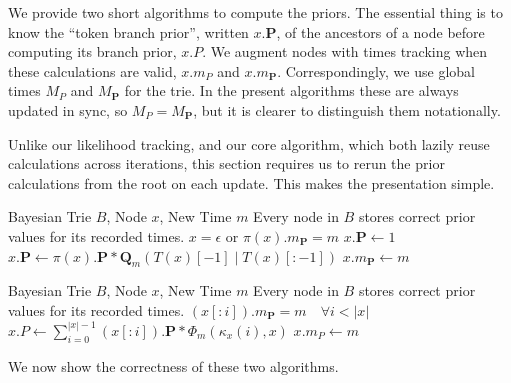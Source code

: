 We provide two short algorithms to compute the priors.
The essential thing is to know the ``token branch prior'', written $x.\mathbf{P}$,
of the ancestors
of a node before computing its branch prior, $x.P$.
We augment nodes with times tracking when these calculations 
are valid, $x.m_P$ and $x.m_\mathbf{P}$.
Correspondingly, we use global times $M_P$ and $M_\mathbf{P}$ for the trie.
In the present algorithms these are always updated in sync, so $M_P = M_\mathbf{P}$,
but it is clearer to distinguish them notationally.

Unlike our likelihood tracking, and our core algorithm, which both
lazily reuse calculations across iterations, this section requires
us to rerun the prior calculations from the root on each update.
This makes the presentation simple.

\begin{algorithm}[H]
\caption{Compute Token Branch Prior}
\label{alg:compute-token-branch-prior}
\begin{algorithmic}[1]
\Require Bayesian Trie $B$, Node $x$, New Time $m$
\Require Every node in $B$ stores correct prior values for its recorded times.
\Require $x = \epsilon$ or $\pi(x).m_\mathbf{P} = m$ 
    \State $x.\mathbf{P} \gets 1$
\Else
    \State $x.\mathbf{P} \gets \pi(x).\mathbf{P} * \mathbf{Q}_m(T(x)[-1] \mid T(x)[:-1])$
\EndIf
\State $x.m_\mathbf{P} \gets m$
\end{algorithmic}
\end{algorithm}

\begin{algorithm}[H]
\caption{Compute Branch Prior}
\label{alg:compute-branch-prior}
\begin{algorithmic}[1]
\Require Bayesian Trie $B$, Node $x$, New Time $m$
\Require Every node in $B$ stores correct prior values for its recorded times.
\Require $(x[:i]).m_\mathbf{P} = m \quad \forall i < |x|$ 
\State $x.P \gets \sum_{i=0}^{|x|-1} (x[:i]).\mathbf{P} * \Phi_m(\kappa_x(i), x)$  
\State $x.m_P \gets m$
\end{algorithmic}
\end{algorithm}

We now show the correctness of these two algorithms.

